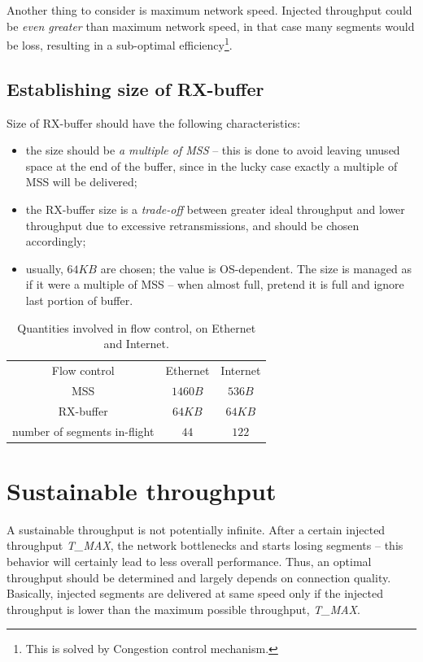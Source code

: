 \documentclass[a4paper, 11pt]{report}
\begin{document}
Another thing to consider is maximum network speed. Injected throughput could
be \emph{even greater} than maximum network speed, in that case many segments
would be loss, resulting in a sub-optimal efficiency\footnote{This is solved by
Congestion control mechanism.}.

\subsection{Establishing size of RX-buffer}

Size of RX-buffer should have the following characteristics:
\begin{itemize}
    \item the size should be \emph{a multiple of MSS} \--- this is done to
        avoid leaving unused space at the end of the buffer, since in the lucky
        case exactly a multiple of MSS will be delivered;
    \item the RX-buffer size is a \emph{trade-off} between greater ideal
        throughput and lower throughput due to excessive retransmissions, and
        should be chosen accordingly;
    \item usually, $64KB$ are chosen; the value is OS-dependent. The size is
        managed as if it were a multiple of MSS \--- when almost full, pretend
        it is full and ignore last portion of buffer.
\end{itemize}

\begin{table}[ht]
\centering
\begin{tabular}{ccc}
    Flow control & Ethernet & Internet \\
    MSS  & $1460B$ & $536B$ \\
    RX-buffer & $64KB$ & $64KB$ \\
    number of segments in-flight & $44$ & $122$
\end{tabular}
\caption{Quantities involved in flow control, on Ethernet and Internet.}\label{tab:FlowControlQuantities}
\end{table}
\bigskip

\section{Sustainable throughput}

A sustainable throughput is not potentially infinite. After a certain injected
throughput \emph{T\_MAX}, the network bottlenecks and starts losing segments
\--- this behavior will certainly lead to less overall performance. Thus, an
optimal throughput should be determined and largely depends on connection
quality. Basically, injected segments are delivered at same speed only if the
injected throughput is lower than the maximum possible throughput,
\emph{T\_MAX}.
\end{document}
